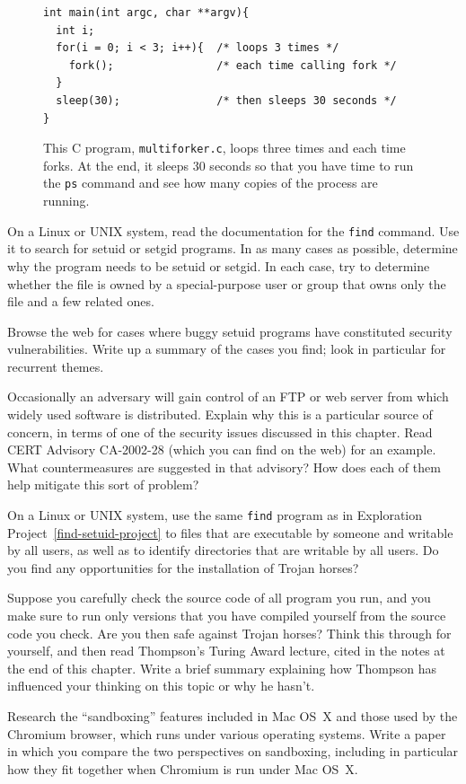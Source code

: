 \begin{chapterEnumerate}
\begin{figure}
\begin{verbatim}
int main(int argc, char **argv){
  int i;
  for(i = 0; i < 3; i++){  /* loops 3 times */
    fork();                /* each time calling fork */
  }
  sleep(30);               /* then sleeps 30 seconds */
}
\end{verbatim}
\caption{This C program, {\tt multiforker.c}, loops three times and
  each time forks.  At the end, it sleeps 30 seconds so that you have
  time to run the {\tt ps} command and see how many copies of the
  process are running.}
\label{multiforker-code}
\end{figure}
\item\label{find-setuid-project}
On a Linux or UNIX system, read the documentation for the \verb|find|
command.  Use it to search for setuid or setgid programs.  In as many
cases as possible, determine why the program needs to be setuid or
setgid.  In each case, try to determine whether the file is owned by a special-purpose user
or group that owns only the file and a few related ones.
\item
Browse the web for cases where buggy setuid programs have constituted
security vulnerabilities.  Write up a summary of the cases you find;
look in particular for recurrent themes.
\item
Occasionally an adversary will gain control of an FTP or web server
from which widely used software is distributed.  Explain why this is a
particular source of concern, in terms of one of the security issues
discussed in this chapter.  Read CERT Advisory CA-2002-28 (which you
can find on the web) for an example.  What countermeasures are
suggested in that advisory?  How does each of them help mitigate this
sort of problem?
\item
On a Linux or UNIX system, use the same {\tt find} program as in
Exploration Project~\ref{find-setuid-project} to files that are
executable by someone and writable by all users, as well as to
identify directories that are writable by all users.  Do you find any
opportunities for the installation of Trojan horses?
\item
Suppose you carefully check the source code of all program you run,
and you make sure to run only versions that you have compiled yourself
from the source code you check.  Are you then safe against Trojan
horses?  Think this through for yourself, and then read Thompson's
Turing Award lecture, cited in the notes at the end of this chapter.
Write a brief summary explaining how Thompson has influenced your
thinking on this topic or why he hasn't.
\item
Research the ``sandboxing'' features included in Mac OS~X and those
used by the Chromium browser, which runs under various operating
systems.  Write a paper in which you compare the two perspectives on
sandboxing, including in particular how they fit together when
Chromium is run under Mac OS~X.
\end{chapterEnumerate}

